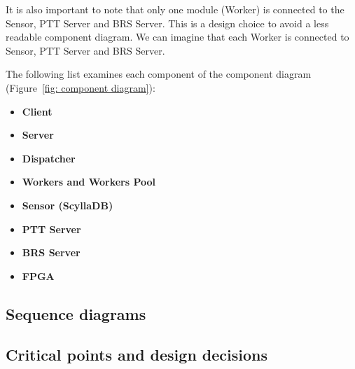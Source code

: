 \documentclass[a4paper]{article}
\newcommand{\highspace}{\vspace{1.2em}\noindent}
\begin{document}
    \highspace
    It is also important to note that only one module (Worker) is connected to the Sensor, PTT Server and BRS Server. This is a design choice to avoid a less readable component diagram. We can imagine that each Worker is connected to Sensor, PTT Server and BRS Server.

    \highspace
    The following list examines each component of the component diagram (Figure~\ref{fig: component diagram}):
    \begin{itemize}
        \item \textbf{Client}

        \item \textbf{Server}

        \item \textbf{Dispatcher}

        \item \textbf{Workers and Workers Pool}

        \item \textbf{Sensor (ScyllaDB)}

        \item \textbf{PTT Server}
        
        \item \textbf{BRS Server}

        \item \textbf{FPGA}
    \end{itemize}    

    \newpage

    \subsection{Sequence diagrams}

    \newpage

    \subsection{Critical points and design decisions}\label{subsection: Critical points and design decisions}
\end{document}
